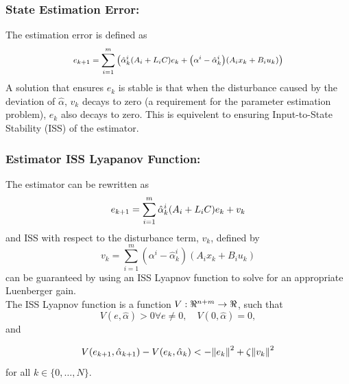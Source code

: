 \documentclass[]{ieeetran}
\begin{document}
\subsubsection{State Estimation Error:}
The estimation error is defined as
\begin{equation} \label{eq:DE_state_error}
	\medmath{e_{k+1} = \sum_{i=1}^m \qty(\hat{\alpha}_k^i\qty(A_i + L_i C)e_k + \qty(\alpha^i - \hat{\alpha}_k^i)\qty(A_i x_k + B_i u_k))}
\end{equation}
A solution that ensures $e_k$ is stable is that when the disturbance caused by the deviation of $\hat{\alpha}$, $v_k$ decays to zero (a requirement for the parameter estimation problem), $e_k$ also decays to zero. This is equivelent to ensuring Input-to-State Stability (ISS) of the estimator.\\

\subsubsection{Estimator ISS Lyapanov Function:}
The estimator can be rewritten as
\begin{equation}\label{eq:DE_state_error_simple}
	e_{k+1} = \sum_{i=1}^m \hat{\alpha}_k^i \qty(A_i + L_i C) e_k + v_k
\end{equation}
and ISS with respect to the disturbance term, $v_k$, defined by
\begin{equation}
	v_k = \sum_{i=1}^m (\alpha^i - \hat{\alpha}_k^i) (A_i x_k + B_i u_k)
\end{equation}
can be guaranteed by using an ISS Lyapnov function to solve for an appropriate Luenberger gain.\\
The ISS Lyapnov function is a function $V : \real^{n+m} \to \real$, such that $$V(e,\hat{\alpha})>0 \forall e\neq 0, \quad V(0,\hat{\alpha}) = 0,$$ and

\begin{equation}
	V(e_{k+1}, \hat{\alpha}_{k+1}) - V(e_k, \hat{\alpha}_k) < -\norm{e_k}^2 + \zeta \norm{v_k}^2
\end{equation}
for all $k \in \{0, \dots,N\}$.

\end{document}
